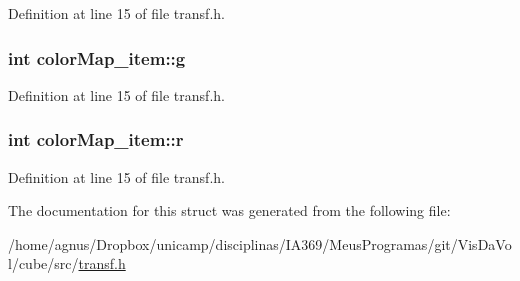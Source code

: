 Definition at line 15 of file transf.h.

\hypertarget{structcolorMap__item_aced65d1d505d181eb5e553afd5713155}{
\subsubsection[{g}]{\setlength{\rightskip}{0pt plus 5cm}int {\bf colorMap\_\-item::g}}}
\label{structcolorMap__item_aced65d1d505d181eb5e553afd5713155}


Definition at line 15 of file transf.h.

\hypertarget{structcolorMap__item_a3311c0394d61bb9b970152d46e323a32}{
\subsubsection[{r}]{\setlength{\rightskip}{0pt plus 5cm}int {\bf colorMap\_\-item::r}}}
\label{structcolorMap__item_a3311c0394d61bb9b970152d46e323a32}


Definition at line 15 of file transf.h.



The documentation for this struct was generated from the following file:\begin{DoxyCompactItemize}
\item 
/home/agnus/Dropbox/unicamp/disciplinas/IA369/MeusProgramas/git/VisDaVol/cube/src/\hyperlink{transf_8h}{transf.h}\end{DoxyCompactItemize}
